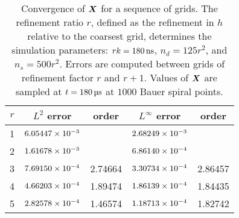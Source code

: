 \begin{table}[tb]
    \centering
    \caption[Convergence of surface positions for relaxing RBC test]{%
Convergence of $\boldsymbol{X}$ for a sequence of grids. The refinement ratio $r$, defined as the refinement in $h$ relative
to the coarsest grid, determines the simulation parameters: $r\timestep = 180\ns$, $n_d = 125r^2$, and
$n_s = 500r^2$. Errors are computed between grids of refinement factor $r$ and $r+1$. Values of $\boldsymbol{X}$ are sampled
at $t = 180\us$ at $1000$ Bauer spiral points.
    }\label{tab:x-rbc-conv}
    \begingroup
    \setlength{\tabcolsep}{9pt}
    \renewcommand{\arraystretch}{1.5}
    \begin{tabular}{c|cc|cc}
                                                                                     \toprule
        $r$ & $L^2$ error            & order   & $L^\infty$ error       & order   \\ \midrule
        1   & ${6.05447}\times 10^{-3}$ &         & ${2.68249}\times 10^{-3}$ &         \\
        2   & ${1.61678}\times 10^{-3}$ &         & ${6.86140}\times 10^{-4}$ &         \\
        3   & ${7.69150}\times 10^{-4}$ & 2.74664 & ${3.30734}\times 10^{-4}$ & 2.86457 \\
        4   & ${4.66203}\times 10^{-4}$ & 1.89474 & ${1.86139}\times 10^{-4}$ & 1.84435 \\
        5   & ${2.82578}\times 10^{-4}$ & 1.46574 & ${1.18713}\times 10^{-4}$ & 1.82742 \\ \bottomrule
    \end{tabular}
    \endgroup
\end{table}
